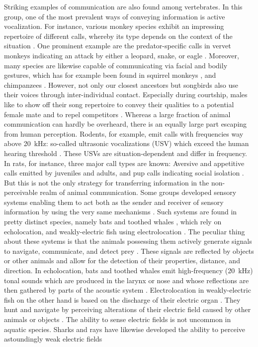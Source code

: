 Striking examples of communication are also found among vertebrates. In this group, one of the most prevalent ways of conveying information is active vocalization. For instance, various monkey species exhibit an impressing repertoire of different calls, whereby its type depends on the context of the situation \parencite{SCHLENKER2016894}. One prominent example are the predator-specific calls in vervet monkeys indicating an attack by either a leopard, snake, or eagle \parencite{seyfarth1980}. Moreover, many species are likewise capable of communicating via facial and bodily gestures, which has for example been found in squirrel monkeys \parencite{anderson2010flexibility}, and chimpanzees \parencite{hobaiter2011gestural}. However, not only our closest ancestors but songbirds also use their voices through inter-individual contact. Especially during courtship, males like to show off their song repertoire to convey their qualities to a potential female mate and to repel competitors \parencite{kroodsma1991function, byers2009female}. Whereas a large fraction of animal communication can hardly be overheard, there is an equally large part escaping from human perception. Rodents, for example, emit calls with frequencies way above \SI{20}{\kilo\hertz}: so-called ultrasonic vocalizations (USV) which exceed the human hearing threshold \parencite{wohr2013affective}. These USVs are situation-dependent and differ in frequency. In rats, for instance, three major call types are known: Aversive and appetitive calls emitted by juveniles and adults, and pup calls indicating social isolation \parencite{wohr2013affective, seffer2014pro}. But this is not the only strategy for transferring information in the non-perceivable realm of animal communication. Some groups developed sensory systems enabling them to act both as the sender and receiver of sensory information by using the very same mechanisms \parencite{jonesCommunicationSelfFriends2021}. Such systems are found in pretty distinct species, namely bats \parencite{simmons1979echolocation} and toothed whales \parencite{kamminga1988echolocation}, which rely on echolocation, and weakly-electric fish using electrolocation \parencite{heiligenberg1973electrolocation}. The peculiar thing about these systems is that the animals possessing them actively generate signals to navigate, communicate, and detect prey \parencite{jonesCommunicationSelfFriends2021}. These signals are reflected by objects or other animals and allow for the detection of their properties, distance, and direction. In echolocation, bats and toothed whales emit high-frequency (\SI{20}{\kilo\hertz}) tonal sounds which are produced in the larynx or nose and whose reflections are then gathered by parts of the acoustic system \parencite{schnitzler2003spatial, park2016ultrasonic}. Electrolocation in weakly-electric fish on the other hand is based on the discharge of their electric organ \parencite{heiligenberg1973electrolocation, meyer1987hormone}. They hunt and navigate by perceiving alterations of their electric field caused by other animals or objects \parencite{von1999active, heiligenberg1973electrolocation}. The ability to sense electric fields is not uncommon in aquatic species. Sharks and rays have likewise developed the ability to perceive astoundingly weak electric fields 
